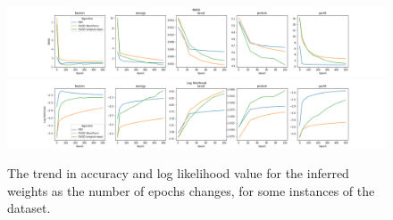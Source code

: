\begin{figure}[H]
    \centering
    \includegraphics[width=\textwidth]{figs/bayesian_epoch_RMSE.png}
    \newline
    \includegraphics[width=\textwidth]{figs/bayesian_epoch_Loglikelihood.png}
    \caption{The trend in accuracy and log likelihood value for the inferred weights as the number of epochs changes, for some instances of the dataset.}
    \label{fig:bnn-epoch}
\end{figure}